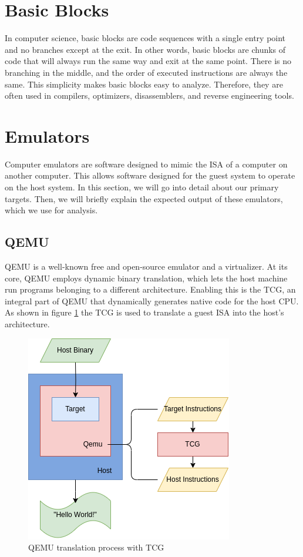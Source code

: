 \section{Basic Blocks}
In computer science, basic blocks are code sequences with a single entry point and no branches except at the exit.
In other words, basic blocks are chunks of code that will always run the same way and exit at the same point.
There is no branching in the middle, and the order of executed instructions are always the same.
This simplicity makes basic blocks easy to analyze.
Therefore, they are often used in compilers, optimizers, disassemblers, and reverse engineering tools.

\section{Emulators}

Computer emulators are software designed to mimic the ISA of a computer on another computer.
This allows software designed for the guest system to operate on the host system. 
In this section, we will go into detail about our primary targets.
Then, we will briefly explain the expected output of these emulators, which we use for analysis.

\subsection{QEMU}
\ac{QEMU} is a well-known free and open-source emulator and a virtualizer. 
At its core, \ac{QEMU} employs dynamic binary translation, which lets the host machine run programs belonging to a different architecture.
Enabling this is the \ac{TCG}, an integral part of \ac{QEMU} that dynamically generates native code for the host CPU.
As shown in figure \ref{fig:qemu_tcg} the \ac{TCG} is used to translate a guest \ac{ISA} into the host's architecture.

\begin{figure}[ht]
    \centering
    \includegraphics[width=0.7\linewidth]{figures/qemu_TCG2}
    \caption[QEMU translation process]{\ac{QEMU} translation process with \ac{TCG}}
    \label{fig:qemu_tcg}
\end{figure}

